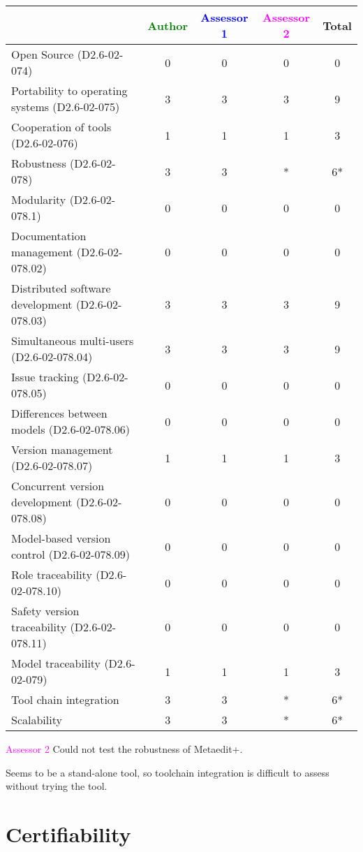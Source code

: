 \begin{tabular}{|l | c | c | c | c|}
\hline
& \textcolor{green}{Author} & \textcolor{blue}{Assessor 1} & \textcolor{magenta}{Assessor 2} & Total \\
\hline 
Open Source (D2.6-02-074) &0 &0 & 0& 0  \\
\hline 
Portability to operating systems (D2.6-02-075) &3 &3 & 3&  9 \\
\hline
Cooperation of tools (D2.6-02-076) &1 &1 & 1& 3 \\
\hline
Robustness (D2.6-02-078) &3 &3 & *& 6* \\
\hline
Modularity (D2.6-02-078.1) &0 &0 & 0& 0 \\
\hline
Documentation management (D2.6-02-078.02) &0 &0 & 0& 0\\
\hline
Distributed software development (D2.6-02-078.03)  &3 &3 & 3& 9\\
\hline
Simultaneous multi-users (D2.6-02-078.04)   &3 &3 & 3& 9 \\
\hline
Issue tracking (D2.6-02-078.05) &0 &0 & 0& 0 \\
\hline
Differences between models (D2.6-02-078.06) &0 &0 & 0& 0 \\
\hline
Version management (D2.6-02-078.07) &1 &1 & 1& 3 \\
\hline
Concurrent version development (D2.6-02-078.08) &0 &0 & 0& 0 \\
\hline
Model-based version control (D2.6-02-078.09) &0 &0 & 0& 0 \\
\hline
Role traceability (D2.6-02-078.10) &0 &0 & 0& 0 \\
\hline
Safety version traceability (D2.6-02-078.11) &0 &0 & 0& 0 \\
\hline
Model traceability (D2.6-02-079) &1 &1 & 1& 3 \\
\hline
Tool chain integration &3 &3 & *& 6* \\
\hline
Scalability &3 &3 & * & 6*\\
\hline
\end{tabular}

\textcolor{magenta}{Assessor 2} Could not test the robustness of Metaedit+.

Seems to be a stand-alone tool, so toolchain integration is difficult to assess
without trying the tool.

\section{Certifiability}

